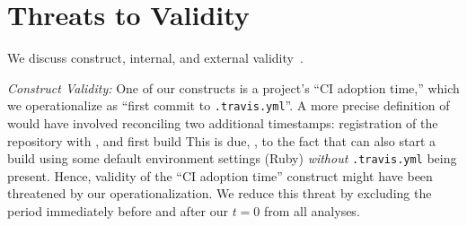 
\section{Threats to Validity}
\label{sec:threats}
We discuss construct, internal, 
and external validity~\cite{perry2000empirical}.

\smallskip \emph{Construct Validity:} %
One of our constructs is a project's ``CI adoption time,'' which 
we operationalize as ``first commit to \texttt{.travis.yml}''. %
A more precise definition of would have involved 
reconciling two additional timestamps: registration of the repository with \Tvis, and 
first build
This is due, \eg, to the fact that \Tvis can also start a build using some default 
environment settings (Ruby) \emph{without} \texttt{.travis.yml} being present.
Hence, validity of the ``CI adoption time'' construct might have been threatened 
by our operationalization.
We reduce this threat by excluding the period immediately before and after
our $t=0$ from all analyses.

